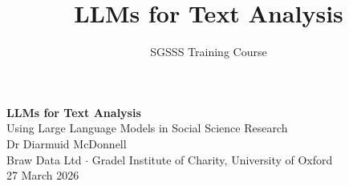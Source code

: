 \documentclass[aspectratio=169]{beamer}
\title{LLMs for Text Analysis}
\subtitle{SGSSS Training Course}
\begin{document}
{
\begin{frame}[plain]
    \begin{center}
        \vspace{1.5cm}
        {\Large\bfseries\color{sgsssMagenta} LLMs for Text Analysis}\\[0.3cm]
        {\large Using Large Language Models in Social Science Research}\\[0.8cm]
        {\normalsize Dr Diarmuid McDonnell}\\[0.1cm]
        {\small Braw Data Ltd \(\cdot\) Gradel Institute of Charity, University of Oxford}\\[0.3cm]
        {\small 27 March 2026}
    \end{center}
\end{frame}
}
\end{document}
